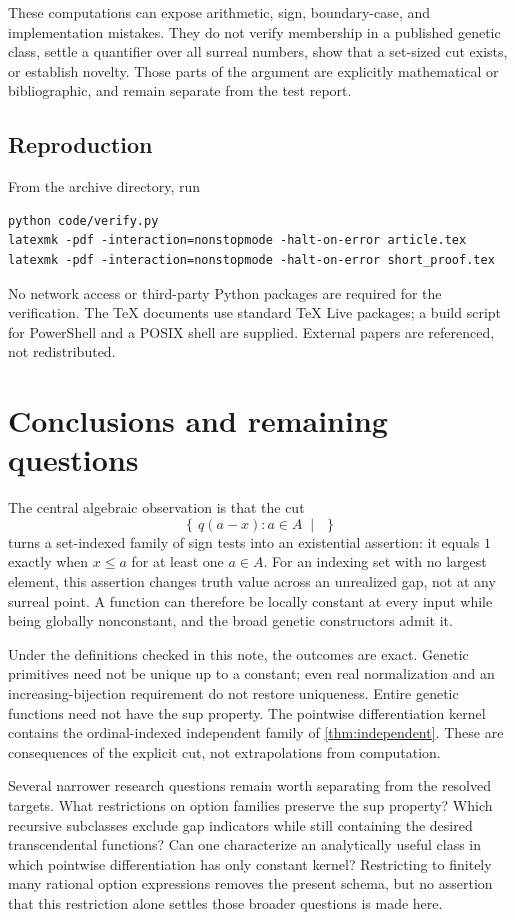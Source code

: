 \documentclass[11pt,letterpaper]{article}
\numberwithin{equation}{section}
\theoremstyle{definition}
\theoremstyle{remark}
\newcommand{\cut}[2]{\left\{\,#1\;\middle|\;#2\,\right\}}
\begin{document}
These computations can expose arithmetic, sign, boundary-case, and
implementation mistakes. They do not verify membership in a published
genetic class, settle a quantifier over all surreal numbers, show that a
set-sized cut exists, or establish novelty. Those parts of the argument
are explicitly mathematical or bibliographic, and remain separate from
the test report.

\subsection{Reproduction}
From the archive directory, run
\begin{verbatim}
python code/verify.py
latexmk -pdf -interaction=nonstopmode -halt-on-error article.tex
latexmk -pdf -interaction=nonstopmode -halt-on-error short_proof.tex
\end{verbatim}
No network access or third-party Python packages are required for the
verification. The TeX documents use standard TeX Live packages; a build
script for PowerShell and a POSIX shell are supplied. External papers are
referenced, not redistributed.

\section{Conclusions and remaining questions}\label{sec:conclusion}
The central algebraic observation is that the cut
\[
 \cut{q(a-x):a\in A}{}
\]
turns a set-indexed family of sign tests into an existential assertion:
it equals $1$ exactly when $x\le a$ for at least one $a\in A$. For an
indexing set with no largest element, this assertion changes truth value
across an unrealized gap, not at any surreal point. A function can
therefore be locally constant at every input while being globally
nonconstant, and the broad genetic constructors admit it.

Under the definitions checked in this note, the outcomes are exact.
Genetic primitives need not be unique up to a constant; even real
normalization and an increasing-bijection requirement do not restore
uniqueness. Entire genetic functions need not have the sup property.
The pointwise differentiation kernel contains the ordinal-indexed
independent family of \cref{thm:independent}. These are consequences of
the explicit cut, not extrapolations from computation.

Several narrower research questions remain worth separating from the
resolved targets. What restrictions on option families preserve the sup
property? Which recursive subclasses exclude gap indicators while still
containing the desired transcendental functions? Can one characterize
an analytically useful class in which pointwise differentiation has only
constant kernel? Restricting to finitely many rational option expressions
removes the present schema, but no assertion that this restriction alone
settles those broader questions is made here.
\end{document}
